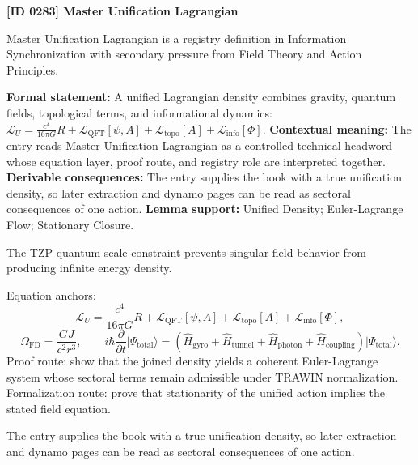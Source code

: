 \clearpage
\noindent\textbf{[ID 0283] Master Unification Lagrangian}\par
\vspace{0.35em}
\begingroup\small
{}
Master Unification Lagrangian is a registry definition in Information Synchronization with secondary pressure from Field Theory and Action Principles.

\begingroup\footnotesize\setlength{\emergencystretch}{3em}\sloppy
\textbf{Formal statement:} A unified Lagrangian density combines gravity, quantum fields, topological terms, and informational dynamics: \(\mathcal{L}_U=\frac{c^4}{16\pi G}R+\mathcal{L}_{\mathrm{QFT}}[\psi,A]+\mathcal{L}_{\mathrm{topo}}[A]+\mathcal{L}_{\mathrm{info}}[\Phi]\). \textbf{Contextual meaning:} The entry reads Master Unification Lagrangian as a controlled technical headword whose equation layer, proof route, and registry role are interpreted together. \textbf{Derivable consequences:} The entry supplies the book with a true unification density, so later extraction and dynamo pages can be read as sectoral consequences of one action. \textbf{Lemma support:} Unified Density; Euler-Lagrange Flow; Stationary Closure.\par
\endgroup

The TZP quantum-scale constraint prevents singular field behavior from producing infinite energy density.

Equation anchors:
\[
\mathcal{L}_U=\frac{c^4}{16\pi G}R+\mathcal{L}_{\mathrm{QFT}}[\psi,A]+\mathcal{L}_{\mathrm{topo}}[A]+\mathcal{L}_{\mathrm{info}}[\Phi],
\]
\[
\Omega_{\mathrm{FD}}=\frac{GJ}{c^2r^3},
\qquad
i\hbar\frac{\partial}{\partial t}\lvert\Psi_{\mathrm{total}}\rangle=
\left(\widehat H_{\mathrm{gyro}}+\widehat H_{\mathrm{tunnel}}+\widehat H_{\mathrm{photon}}+\widehat H_{\mathrm{coupling}}\right)\lvert\Psi_{\mathrm{total}}\rangle.
\]
Proof route: show that the joined density yields a coherent Euler-Lagrange system whose sectoral terms remain admissible under TRAWIN normalization. Formalization route: prove that stationarity of the unified action implies the stated field equation.

The entry supplies the book with a true unification density, so later extraction and dynamo pages can be read as sectoral consequences of one action.
\endgroup

